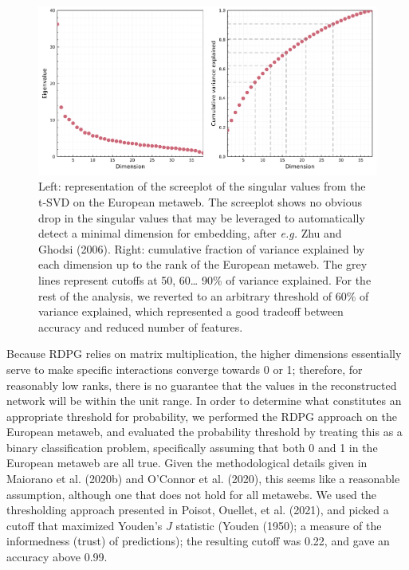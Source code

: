 \documentclass[11pt]{article}
\makeatletter
\def\maxwidth{\ifdim\Gin@nat@width>\linewidth\linewidth
\else\Gin@nat@width\fi}
\let\Oldincludegraphics\includegraphics
\renewcommand{\includegraphics}[1]{\Oldincludegraphics[width=\maxwidth]{#1}}
\makeatother
\begin{document}
\begin{figure}
\hypertarget{fig:scree}{%
\centering
\includegraphics{figures/figure-screeplot.png}
\caption{Left: representation of the screeplot of the singular values
from the t-SVD on the European metaweb. The screeplot shows no obvious
drop in the singular values that may be leveraged to automatically
detect a minimal dimension for embedding, after \emph{e.g.} Zhu and
Ghodsi (2006). Right: cumulative fraction of variance explained by each
dimension up to the rank of the European metaweb. The grey lines
represent cutoffs at 50, 60\ldots{} 90\% of variance explained. For the
rest of the analysis, we reverted to an arbitrary threshold of 60\% of
variance explained, which represented a good tradeoff between accuracy
and reduced number of features.}\label{fig:scree}
}
\end{figure}

Because RDPG relies on matrix multiplication, the higher dimensions
essentially serve to make specific interactions converge towards 0 or 1;
therefore, for reasonably low ranks, there is no guarantee that the
values in the reconstructed network will be within the unit range. In
order to determine what constitutes an appropriate threshold for
probability, we performed the RDPG approach on the European metaweb, and
evaluated the probability threshold by treating this as a binary
classification problem, specifically assuming that both 0 and 1 in the
European metaweb are all true. Given the methodological details given in
Maiorano et al. (2020b) and O'Connor et al. (2020), this seems like a
reasonable assumption, although one that does not hold for all metawebs.
We used the thresholding approach presented in Poisot, Ouellet, et al.
(2021), and picked a cutoff that maximized Youden's \(J\) statistic
(Youden (1950); a measure of the informedness (trust) of predictions);
the resulting cutoff was 0.22, and gave an accuracy above 0.99.
\end{document}
